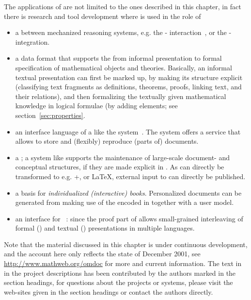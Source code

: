 The applications of {\omdoc} are not limited to the ones described in this
chapter, in fact there is research and tool development where {\omdoc} is used in
the role of 
\begin{itemize}
\item a {} between mechanized reasoning systems,
  e.g. the {\clam}-{\hol} interaction~\cite{BouSli:aibcah98}, or the
  {\OMEGA}-{\tps}~\cite{BeBiSo:itao99} integration.
\item a data format that supports the {} from informal
  presentation to formal specification of mathematical objects and theories.
  Basically, an informal textual presentation can first be marked up, by making
  its structure explicit (classifying text fragments as
  definitions, theorems, proofs, linking text, and their relations), and then
  formalizing the textually given mathematical knowledge in logical formulae (by
  adding {} elements; see section~\ref{sec:properties}.
\item an interface language of a {} like the {\mbase}
  system~\cite{FraKoh:sdmaomkb00,KohFra:rkcimss00}. The system offers a service
  that allows to store and (flexibly) reproduce (parts of) {\omdoc} documents.
\item a {}; a system like {\mbase} supports the
  maintenance of large-scale document- and conceptual structures, if they are made
  explicit in {\omdoc}. As {\omdoc} can directly be transformed to e.g.
  {\xhtml}+{\mathml}, or {\LaTeX}, external input to {\mbase} can directly be
  published.
\item a basis for {\emph{individualized (interactive)
      books}}.  Personalized
  {\omdoc} documents can be generated from {\mbase} making use of the
  {} encoded in {\mbase}
  together with a user model.
\item an interface for {}~\cite{HuangFiedler:pvip97,Fiedler:uacatp99}: since the proof
  part of {\omdoc} allows small-grained interleaving of formal ({})
  and textual ({}) presentations in multiple languages. 
\end{itemize}

Note that the material discussed in this chapter is under continuous development,
and the account here only reflects the state of December 2001, see
{\url{http://www.mathweb.org/omdoc}} for more and current information. The text in
in the project descriptions has been contributed by the authors marked in the
section headings, for questions about the projects or systems, please visit the
web-sites given in the section headings or contact the authors directly.


